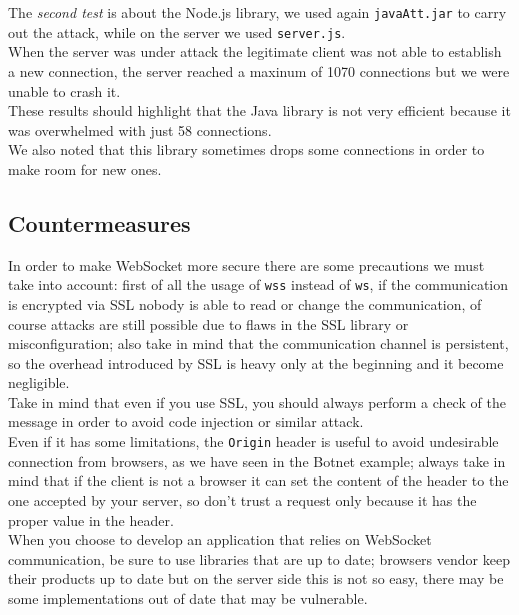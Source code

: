 	The \emph{second test} is about the Node.js library, we used again \texttt{javaAtt.jar} to carry out the attack, while on the server we used \texttt{server.js}.\\
	When the server was under attack the legitimate client was not able to establish a new connection, the server reached a maxinum of 1070 connections 
	but we were unable to crash it.\\
	These results should highlight that the Java library is not very efficient because it was overwhelmed with just 58 connections.\\
	We also noted that this library sometimes drops some connections in order to make room for new ones.\\
	

	\subsection{Countermeasures}
	In order to make WebSocket more secure there are some precautions we must take into account: first of all the usage of \texttt{wss} instead of \texttt{ws}, if the
	communication is encrypted via SSL nobody is able to read or change the communication, of course attacks are still possible due to flaws in the SSL library or misconfiguration;
	also take in mind that the communication channel is persistent, so the overhead introduced by SSL is heavy only at the beginning and it become negligible\cite{koch2013websockets}.\\
	Take in mind that even if you use SSL, you should always perform a check of the message in order to avoid code injection or similar attack.\\
	
	Even if it has some limitations, the \texttt{Origin} header is useful to avoid undesirable connection from browsers, as we have seen in the Botnet example; always take in
	mind that if the client is not a browser it can set the content of the header to the one accepted by your server, so don't trust a request only because it has the proper
	value in the header.\\
	
	When you choose to develop an application that relies on WebSocket communication, be sure to use libraries that are up to date; browsers vendor keep their products up to date
	but on the server side this is not so easy, there may be some implementations out of date that may be vulnerable.\\
	

